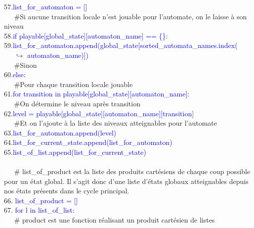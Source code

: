 \documentclass[12pt,a4paper]{article}
\begin{document}
{			57.\qquad\qquad\textcolor{blue}{list\_for\_automaton = []}\\
			\textcolor{white}{3ch}\qquad\qquad\#Si aucune transition locale n'est jouable pour l'automate, on le laisse à son niveau\\
			58.\qquad\qquad\textcolor{blue}{if playable[global\_state][automaton\_name] == \{\}:}\\
				59.\qquad\qquad\qquad\textcolor{blue}{list\_for\_automaton.append(global\_state[sorted\_automata\_names.index(}\\
				\textcolor{white}{3ch}\qquad\qquad\qquad\qquad\qquad$\hookrightarrow$ \textcolor{blue}{automaton\_name)])}\\
			\textcolor{white}{3ch}\qquad\qquad\#Sinon\\
			60.\qquad\qquad\textcolor{blue}{else:}\\
				\textcolor{white}{3ch}\qquad\qquad\qquad\#Pour chaque transition locale jouable\\
				61.\qquad\qquad\qquad\textcolor{blue}{for transition in playable[global\_state][automaton\_name]:}\\
					\textcolor{white}{3ch}\qquad\qquad\qquad\qquad\#On détermine le niveau après transition\\
					62.\qquad\qquad\qquad\qquad\textcolor{blue}{level = playable[global\_state][automaton\_name][transition]}\\
					\textcolor{white}{3ch}\qquad\qquad\qquad\qquad\#Et on l'ajoute à la liste des niveaux atteignables pour l'automate\\
					63.\qquad\qquad\qquad\qquad\textcolor{blue}{list\_for\_automaton.append(level)}\\
			64.\qquad\qquad\textcolor{blue}{list\_for\_current\_state.append(list\_for\_automaton)}\\
		65.\qquad\textcolor{blue}{list\_of\_list.append(list\_for\_current\_state)}\\ \\
	\textcolor{white}{3ch}\# list\_of\_product est la liste des produits cartésiens de chaque coup possible pour un état global. Il s'agit donc d'une liste d'états globaux atteignables depuis nos états présents dans le cycle 
	principal.\\
	66. \textcolor{blue}{list\_of\_product = []}\\
	67. \textcolor{blue}{for l in list\_of\_list:}\\
		\textcolor{white}{3ch}\qquad\# product est une fonction réalisant un produit cartésien de listes\\
}
\end{document}
